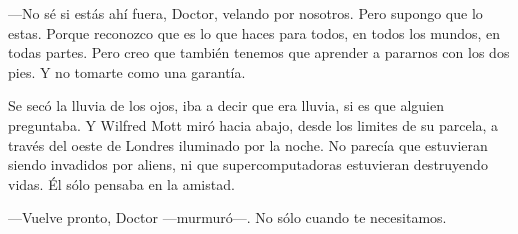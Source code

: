 ---No sé si estás ahí fuera, Doctor, velando por nosotros. Pero supongo
que lo estas. Porque reconozco que es lo que haces para todos, en todos
los mundos, en todas partes. Pero creo que también tenemos que aprender
a pararnos con los dos pies. Y no tomarte como una garantía.

Se secó la lluvia de los ojos, iba a decir que era lluvia, si es que
alguien preguntaba. Y Wilfred Mott miró hacia abajo, desde los limites
de su parcela, a través del oeste de Londres iluminado por la noche. No
parecía que estuvieran siendo invadidos por aliens, ni que
supercomputadoras estuvieran destruyendo vidas. Él sólo pensaba en la
amistad.

---Vuelve pronto, Doctor ---murmuró---. No sólo cuando te necesitamos.
